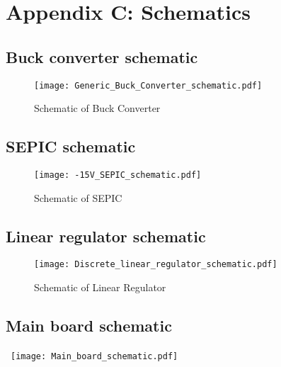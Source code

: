 \chapter*{Appendix C: Schematics}
\label{chap:appendix-C-schematics}

\section*{Buck converter schematic} \label{Appendix_buck_schematic}
{}
\begin{figure}[ht]  
    \texttt{[image: Generic\_Buck\_Converter\_schematic.pdf]}
    \caption{Schematic of Buck Converter}
    \label{fig:buck-schematic}
\end{figure}

\section*{SEPIC schematic} \label{Appendix_SEPIC_schematic}
\begin{figure}[!ht]
    \texttt{[image: -15V\_SEPIC\_schematic.pdf]}
    \caption{Schematic of SEPIC}
    \label{fig:SEPIC-schematic}
\end{figure}
    
\section*{Linear regulator schematic}\label{Appendix_lin_schematic}
\begin{figure}[!htb]
    \texttt{[image: Discrete\_linear\_regulator\_schematic.pdf]}
    \caption{Schematic of Linear Regulator}
    \label{fig:Linear-regulator-schematic}
\end{figure}  

\section*{Main board schematic} \label{Appendix_main_schematic}
\
\texttt{[image: Main\_board\_schematic.pdf]}


